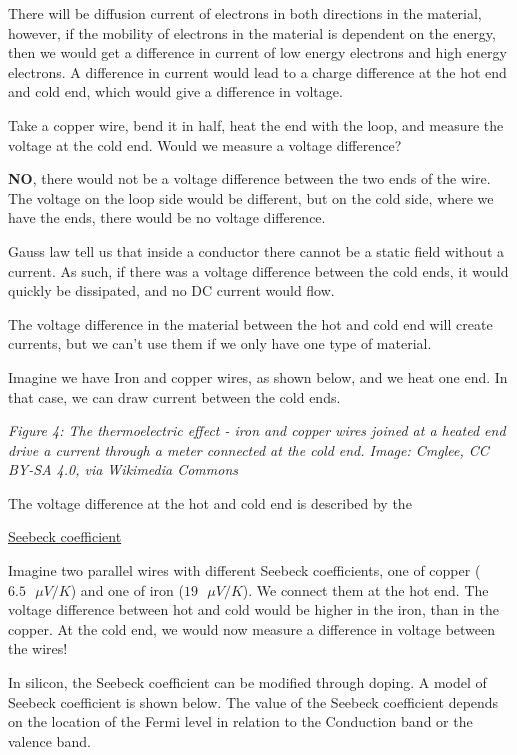 There will be diffusion current of electrons in both directions in the
material, however, if the mobility of electrons in the material is
dependent on the energy, then we would get a difference in current of
low energy electrons and high energy electrons. A difference in current
would lead to a charge difference at the hot end and cold end, which
would give a difference in voltage.

Take a copper wire, bend it in half, heat the end with the loop, and
measure the voltage at the cold end. Would we measure a voltage
difference?

\textbf{NO}, there would not be a voltage difference between the two
ends of the wire. The voltage on the loop side would be different, but
on the cold side, where we have the ends, there would be no voltage
difference.

Gauss law tell us that inside a conductor there cannot be a static field
without a current. As such, if there was a voltage difference between
the cold ends, it would quickly be dissipated, and no DC current would
flow.

The voltage difference in the material between the hot and cold end will
create currents, but we can't use them if we only have one type of
material.

Imagine we have Iron and copper wires, as shown below, and we heat one
end. In that case, we can draw current between the cold ends.


{
\centering
{}
}

\emph{Figure 4: The thermoelectric effect - iron and copper wires joined
at a heated end drive a current through a meter connected at the cold
end. Image: Cmglee, CC BY-SA 4.0, via Wikimedia Commons}

The voltage difference at the hot and cold end is described by the

\href{https://en.wikipedia.org/wiki/Seebeck_coefficient}{Seebeck
coefficient}

Imagine two parallel wires with different Seebeck coefficients, one of
copper (\(6.5\text{ } \mu V/K\)) and one of iron
(\(19\text{ } \mu V/K\)). We connect them at the hot end. The voltage
difference between hot and cold would be higher in the iron, than in the
copper. At the cold end, we would now measure a difference in voltage
between the wires!

In silicon, the Seebeck coefficient can be modified through doping. A
model of Seebeck coefficient is shown below. The value of the Seebeck
coefficient depends on the location of the Fermi level in relation to
the Conduction band or the valence band.


